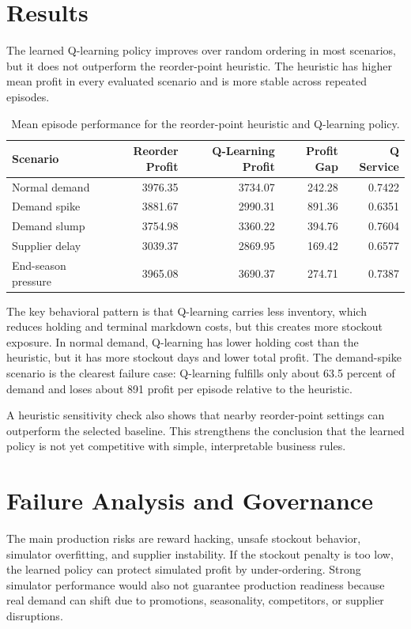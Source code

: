 \documentclass[11pt]{article}
\begin{document}
\section*{Results}

The learned Q-learning policy improves over random ordering in most scenarios, but it does not outperform the reorder-point heuristic. The heuristic has higher mean profit in every evaluated scenario and is more stable across repeated episodes.

\begin{table}[htbp]
\centering
\begin{tabular}{lrrrr}
\toprule
Scenario & Reorder Profit & Q-Learning Profit & Profit Gap & Q Service \\
\midrule
Normal demand & 3976.35 & 3734.07 & 242.28 & 0.7422 \\
Demand spike & 3881.67 & 2990.31 & 891.36 & 0.6351 \\
Demand slump & 3754.98 & 3360.22 & 394.76 & 0.7604 \\
Supplier delay & 3039.37 & 2869.95 & 169.42 & 0.6577 \\
End-season pressure & 3965.08 & 3690.37 & 274.71 & 0.7387 \\
\bottomrule
\end{tabular}
\caption{Mean episode performance for the reorder-point heuristic and Q-learning policy.}
\end{table}

The key behavioral pattern is that Q-learning carries less inventory, which reduces holding and terminal markdown costs, but this creates more stockout exposure. In normal demand, Q-learning has lower holding cost than the heuristic, but it has more stockout days and lower total profit. The demand-spike scenario is the clearest failure case: Q-learning fulfills only about 63.5 percent of demand and loses about 891 profit per episode relative to the heuristic.

A heuristic sensitivity check also shows that nearby reorder-point settings can outperform the selected baseline. This strengthens the conclusion that the learned policy is not yet competitive with simple, interpretable business rules.

\section*{Failure Analysis and Governance}

The main production risks are reward hacking, unsafe stockout behavior, simulator overfitting, and supplier instability. If the stockout penalty is too low, the learned policy can protect simulated profit by under-ordering. Strong simulator performance would also not guarantee production readiness because real demand can shift due to promotions, seasonality, competitors, or supplier disruptions.
\end{document}
